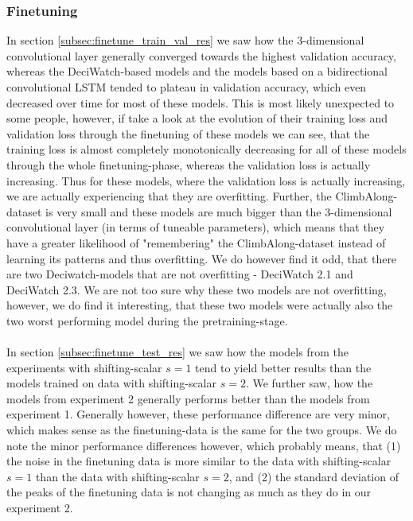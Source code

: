 \documentclass[./main.tex]{subfiles}
\begin{document}
\subsubsection{Finetuning}
In section \ref{subsec:finetune_train_val_res} we saw how the 3-dimensional convolutional layer generally converged towards the highest validation accuracy, whereas the DeciWatch-based models and the models based on a bidirectional convolutional LSTM tended to plateau in validation accuracy, which even decreased over time for most of these models. This is most likely unexpected to some people, however, if take a look at the evolution of their training loss and validation loss through the finetuning of these models we can see, that the training loss is almost completely monotonically decreasing for all of these models through the whole finetuning-phase, whereas the validation loss is actually increasing. Thus for these models, where the validation loss is actually increasing, we are actually experiencing that they are overfitting. Further, the ClimbAlong-dataset is very small and these models are much bigger than the 3-dimensional convolutional layer (in terms of tuneable parameters), which means that they have a greater likelihood of "remembering" the ClimbAlong-dataset instead of learning its patterns and thus overfitting. We do however find it odd, that there are two Deciwatch-models that are not overfitting - DeciWatch 2.1 and DeciWatch 2.3. We are not too sure why these two models are not overfitting, however, we do find it interesting, that these two models were actually also the two worst performing model during the pretraining-stage.
\\
\\
In section \ref{subsec:finetune_test_res} we saw how the models from the experiments with shifting-scalar $s = 1$ tend to yield better results than the models trained on data with shifting-scalar $s = 2$. We further saw, how the models from experiment 2 generally performs better than the models from experiment 1. Generally however, these performance difference are very minor, which makes sense as the finetuning-data is the same for the two groups. We do note the minor performance differences however, which probably means, that (1) the noise in the finetuning data is more similar to the data with shifting-scalar $s = 1$ than the data with shifting-scalar $s = 2$, and (2) the standard deviation of the peaks of the finetuning data is not changing as much as they do in our experiment 2. 
\\
\\
\end{document}
